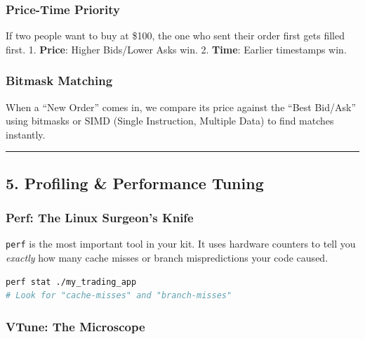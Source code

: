 \hypertarget{price-time-priority}{%
\subsubsection{Price-Time Priority}\label{price-time-priority}}

If two people want to buy at \$100, the one who sent their order first
gets filled first. 1. \textbf{Price}: Higher Bids/Lower Asks win. 2.
\textbf{Time}: Earlier timestamps win.

\hypertarget{bitmask-matching}{%
\subsubsection{Bitmask Matching}\label{bitmask-matching}}

When a ``New Order'' comes in, we compare its price against the ``Best
Bid/Ask'' using bitmasks or SIMD (Single Instruction, Multiple Data) to
find matches instantly.

\begin{center}\rule{0.5\linewidth}{0.5pt}\end{center}

\hypertarget{profiling-performance-tuning}{%
\subsection{5. Profiling \& Performance
Tuning}\label{profiling-performance-tuning}}

\hypertarget{perf-the-linux-surgeons-knife}{%
\subsubsection{Perf: The Linux Surgeon's
Knife}\label{perf-the-linux-surgeons-knife}}

\passthrough{\lstinline!perf!} is the most important tool in your kit.
It uses hardware counters to tell you \emph{exactly} how many cache
misses or branch mispredictions your code caused.

\begin{lstlisting}[language=bash]
perf stat ./my_trading_app
# Look for "cache-misses" and "branch-misses"
\end{lstlisting}

\hypertarget{vtune-the-microscope}{%
\subsubsection{VTune: The Microscope}\label{vtune-the-microscope}}

